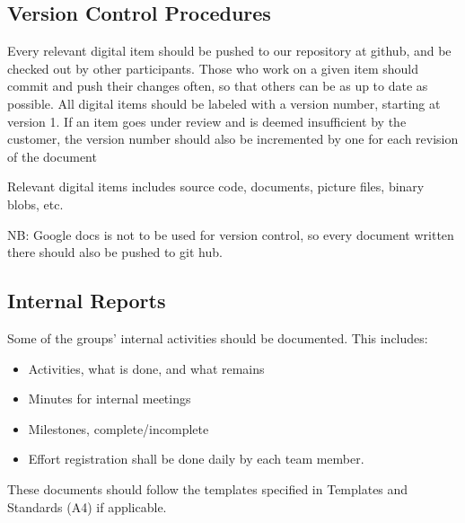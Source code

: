 \subsection{Version Control Procedures}
Every relevant digital item should be pushed to our \gls{repository} at github, and be checked out by other participants. Those who work on a given item should commit and push their changes often, so that others can be as up to date as possible. All digital items should be labeled with a version number, starting at version 1. If an item goes under review and is deemed insufficient by the customer, the version number should also be incremented by one for each revision of the document

Relevant digital items includes source code, documents, picture files, binary blobs, etc.

NB: Google docs is not to be used for version control, so every document written there should also be pushed to git hub.

\subsection{Internal Reports}
Some of the groups' internal activities should be documented. This includes:
\begin{itemize}
	\item Activities, what is done, and what remains
	\item Minutes for internal meetings
	\item Milestones, complete/incomplete
	\item Effort registration shall be done daily by each team member.
\end{itemize}
These documents should follow the templates specified in Templates and Standards (A4) if applicable.


